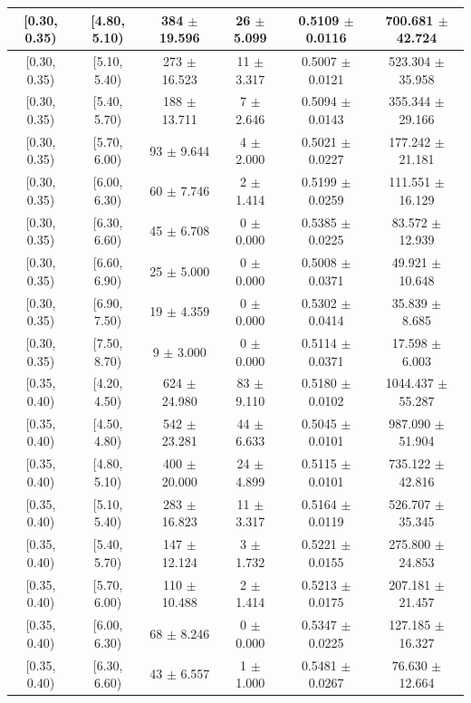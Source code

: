 \begin{longtable}{|c|c|c|c|c|c|}
\hline
[0.30, 0.35) & [4.80, 5.10) & 384 $\pm$ 19.596 & 26 $\pm$ 5.099 & 0.5109 $\pm$ 0.0116 & 700.681 $\pm$ 42.724 \\ 
\hline
[0.30, 0.35) & [5.10, 5.40) & 273 $\pm$ 16.523 & 11 $\pm$ 3.317 & 0.5007 $\pm$ 0.0121 & 523.304 $\pm$ 35.958 \\ 
\hline
[0.30, 0.35) & [5.40, 5.70) & 188 $\pm$ 13.711 & 7 $\pm$ 2.646 & 0.5094 $\pm$ 0.0143 & 355.344 $\pm$ 29.166 \\ 
\hline
[0.30, 0.35) & [5.70, 6.00) & 93 $\pm$ 9.644 & 4 $\pm$ 2.000 & 0.5021 $\pm$ 0.0227 & 177.242 $\pm$ 21.181 \\ 
\hline
[0.30, 0.35) & [6.00, 6.30) & 60 $\pm$ 7.746 & 2 $\pm$ 1.414 & 0.5199 $\pm$ 0.0259 & 111.551 $\pm$ 16.129 \\ 
\hline
[0.30, 0.35) & [6.30, 6.60) & 45 $\pm$ 6.708 & 0 $\pm$ 0.000 & 0.5385 $\pm$ 0.0225 & 83.572 $\pm$ 12.939 \\ 
\hline
[0.30, 0.35) & [6.60, 6.90) & 25 $\pm$ 5.000 & 0 $\pm$ 0.000 & 0.5008 $\pm$ 0.0371 & 49.921 $\pm$ 10.648 \\ 
\hline
[0.30, 0.35) & [6.90, 7.50) & 19 $\pm$ 4.359 & 0 $\pm$ 0.000 & 0.5302 $\pm$ 0.0414 & 35.839 $\pm$ 8.685 \\ 
\hline
[0.30, 0.35) & [7.50, 8.70) & 9 $\pm$ 3.000 & 0 $\pm$ 0.000 & 0.5114 $\pm$ 0.0371 & 17.598 $\pm$ 6.003 \\ 
\hline
[0.35, 0.40) & [4.20, 4.50) & 624 $\pm$ 24.980 & 83 $\pm$ 9.110 & 0.5180 $\pm$ 0.0102 & 1044.437 $\pm$ 55.287 \\ 
\hline
[0.35, 0.40) & [4.50, 4.80) & 542 $\pm$ 23.281 & 44 $\pm$ 6.633 & 0.5045 $\pm$ 0.0101 & 987.090 $\pm$ 51.904 \\ 
\hline
[0.35, 0.40) & [4.80, 5.10) & 400 $\pm$ 20.000 & 24 $\pm$ 4.899 & 0.5115 $\pm$ 0.0101 & 735.122 $\pm$ 42.816 \\ 
\hline
[0.35, 0.40) & [5.10, 5.40) & 283 $\pm$ 16.823 & 11 $\pm$ 3.317 & 0.5164 $\pm$ 0.0119 & 526.707 $\pm$ 35.345 \\ 
\hline
[0.35, 0.40) & [5.40, 5.70) & 147 $\pm$ 12.124 & 3 $\pm$ 1.732 & 0.5221 $\pm$ 0.0155 & 275.800 $\pm$ 24.853 \\ 
\hline
[0.35, 0.40) & [5.70, 6.00) & 110 $\pm$ 10.488 & 2 $\pm$ 1.414 & 0.5213 $\pm$ 0.0175 & 207.181 $\pm$ 21.457 \\ 
\hline
[0.35, 0.40) & [6.00, 6.30) & 68 $\pm$ 8.246 & 0 $\pm$ 0.000 & 0.5347 $\pm$ 0.0225 & 127.185 $\pm$ 16.327 \\ 
\hline
[0.35, 0.40) & [6.30, 6.60) & 43 $\pm$ 6.557 & 1 $\pm$ 1.000 & 0.5481 $\pm$ 0.0267 & 76.630 $\pm$ 12.664 \\ 

\end{longtable}
